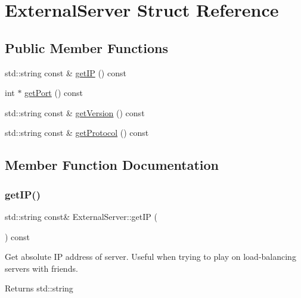 \hypertarget{struct_external_server}{}\section{External\+Server Struct Reference}
\label{struct_external_server}
\subsection*{Public Member Functions}
\begin{DoxyCompactItemize}
\item 
std\+::string const  \& \mbox{\hyperlink{struct_external_server_aee282703c39df8373719e813697deed3}{get\+IP}} () const
\item 
int $\ast$ \mbox{\hyperlink{struct_external_server_a62f546d957c5415165449cb42bd2ed28}{get\+Port}} () const
\item 
std\+::string const  \& \mbox{\hyperlink{struct_external_server_ae0f3924b06684ee49915ca02d3378db2}{get\+Version}} () const
\item 
std\+::string const  \& \mbox{\hyperlink{struct_external_server_ada8686e546e38af4c6e1e978f2f659d5}{get\+Protocol}} () const
\end{DoxyCompactItemize}


\subsection{Member Function Documentation}
\mbox{\label{struct_external_server_aee282703c39df8373719e813697deed3}} 
\subsubsection{\texorpdfstring{getIP()}{getIP()}}
{\footnotesize\ttfamily std\+::string const\& External\+Server\+::get\+IP (\begin{DoxyParamCaption}{ }\end{DoxyParamCaption}) const}

Get absolute IP address of server. Useful when trying to play on load-\/balancing servers with friends. \begin{DoxyReturn}{Returns}
std\+::string 
\end{DoxyReturn}
\mbox{\label{struct_external_server_a62f546d957c5415165449cb42bd2ed28}} 
